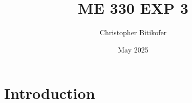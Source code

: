 \documentclass{article}
\title{ME 330 EXP 3}
\author{Christopher Bitikofer}
\date{May 2025}
\begin{document}
\maketitle

\section{Introduction}
\end{document}
